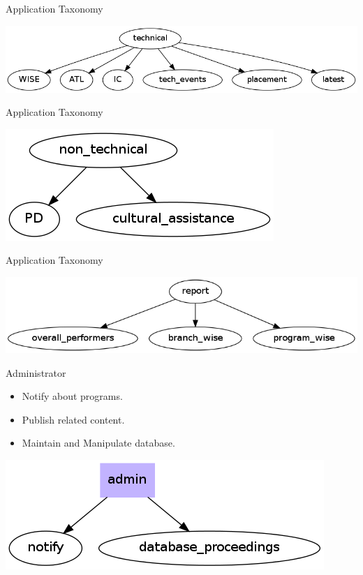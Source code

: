 \documentclass[14pt]{beamer}
\begin{document}
\begin{frame}{Application Taxonomy}
	\begin{center}
	\includegraphics[scale = 0.38]{tech.png}
	\end{center}
\end{frame}

\begin{frame}{Application Taxonomy}
	\begin{center}
	\includegraphics[scale = 0.5]{nontech.png}
	\end{center}
\end{frame}

\begin{frame}{Application Taxonomy}
	\begin{center}
	\includegraphics[scale = 0.4]{report.png}
	\end{center}
\end{frame}

\begin{frame}{Administrator}
	\begin{itemize}
		\item Notify about programs.
		\item Publish related content.
		\item Maintain and Manipulate  database.
	\end{itemize}
	\begin{center}
	\includegraphics[scale=0.5]{admin.png}
	\end{center}
\end{frame}
\end{document}

